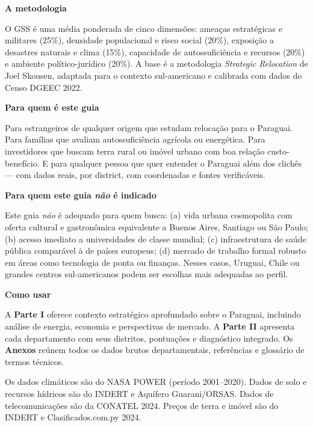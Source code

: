 \documentclass[10pt,a5paper,twoside]{book}
\begin{document}
\medskip
\textbf{A metodologia}

O GSS é uma média ponderada de cinco dimensões: ameaças estratégicas e militares (25\%), densidade populacional e risco social (20\%), exposição a desastres naturais e clima (15\%), capacidade de autossuficiência e recursos (20\%) e ambiente político-jurídico (20\%). A base é a metodologia \textit{Strategic Relocation} de Joel Skousen, adaptada para o contexto sul-americano e calibrada com dados do Censo DGEEC 2022.

\medskip
\textbf{Para quem é este guia}

Para estrangeiros de qualquer origem que estudam relocação para o Paraguai. Para famílias que avaliam autossuficiência agrícola ou energética. Para investidores que buscam terra rural ou imóvel urbano com boa relação custo-benefício. E para qualquer pessoa que quer entender o Paraguai além dos clichês — com dados reais, por district, com coordenadas e fontes verificáveis.

\medskip
\textbf{Para quem este guia \emph{não} é indicado}

Este guia \textit{não} é adequado para quem busca: (a) vida urbana cosmopolita com oferta cultural e gastronômica equivalente a Buenos Aires, Santiago ou São Paulo; (b) acesso imediato a universidades de classe mundial; (c) infraestrutura de saúde pública comparável à de países europeus; (d) mercado de trabalho formal robusto em áreas como tecnologia de ponta ou finanças. Nesses casos, Uruguai, Chile ou grandes centros sul-americanos podem ser escolhas mais adequadas ao perfil.

\medskip


\medskip
\textbf{Como usar}

A \textbf{Parte I} oferece contexto estratégico aprofundado sobre o Paraguai, incluindo análise de energia, economia e perspectivas de mercado. A \textbf{Parte II} apresenta cada departamento com seus distritos, pontuações e diagnóstico integrado. Os \textbf{Anexos} reúnem todos os dados brutos departamentais, referências e glossário de termos técnicos.

\medskip
Os dados climáticos são do NASA POWER (período 2001--2020). Dados de solo e recursos hídricos são do INDERT e Aquífero Guarani/ORSAS. Dados de telecomunicações são da CONATEL 2024. Preços de terra e imóvel são do INDERT e Clasificados.com.py 2024.

\clearpage



\end{document}
